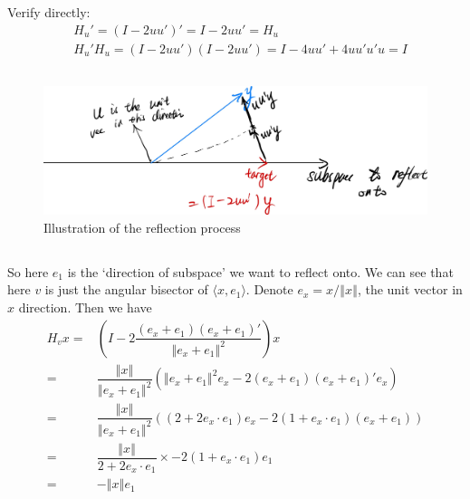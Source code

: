 \documentclass[11pt,a4paper]{ctexart}
\numberwithin{equation}{section}%
\begin{document}
\section{}

\subsection{}
Verify directly:
\begin{align*}
    &H_u'=(I-2uu')' = I-2uu' = H_u\\
    &H_u'H_u = (I-2uu')(I-2uu') = I-4uu'+4uu'u'u = I 
\end{align*}

\subsection{}
\begin{figure}[H]
    \centering
    \includegraphics[width=0.7\linewidth]{HW1Pic2.jpg}
    \caption{Illustration of the reflection process}
\end{figure}


\subsection{}
So here $ e_1 $ is the `direction of subspace' we want to reflect onto. We can see that here $ v $ is just the angular bisector of $ \langle x,e_1\rangle $. Denote $ e_x = x/\left\Vert x \right\Vert $, the unit vector in $ x $ direction. Then we have
\begin{align*}
    H_vx=&\left( I-2\dfrac{ (e_x+e_1)(e_x+e_1)' }{ \left\Vert e_x+e_1 \right\Vert^2  }  \right) x\\
    =&\dfrac{ \left\Vert x \right\Vert  }{ \left\Vert e_x+e_1 \right\Vert^2 }\left( \left\Vert e_x+e_1 \right\Vert^2e_x-2(e_x+e_1)(e_x+e_1)'e_x \right)  \\
    =&\dfrac{ \left\Vert x \right\Vert  }{ \left\Vert e_x+e_1 \right\Vert^2 }\left((2+2e_x\cdot e_1)e_x-2(1+e_x\cdot e_1)(e_x+e_1) \right)\\
    =&\dfrac{ \left\Vert x \right\Vert  }{ 2+2e_x\cdot e_1 }\times -2(1+e_x\cdot e_1)e_1\\
    =&-\left\Vert x \right\Vert e_1
\end{align*}
\end{document}
